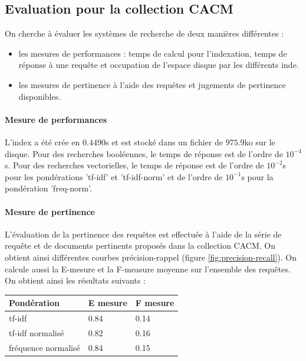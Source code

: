 \documentclass[12pt,a4paper]{article}
\begin{document}
\subsection{Evaluation pour la collection CACM}

On cherche à évaluer les systèmes de recherche de deux manières différentes :
\begin{itemize}
\item les mesures de performances : temps de calcul pour l’indexation, temps de réponse à une requête et occupation de l’espace disque par les différents inde.
\item les mesures de pertinence à l'aide des requêtes et jugements de pertinence disponibles.
\end{itemize}

\paragraph{Mesure de performances} L'index a été crée en $0.4490$s et est stocké dans un fichier de $975.9$ko sur le disque.
Pour des recherches booléennes, le temps de réponse est de l'ordre de $10^{-4}$s.
Pour des recherches vectorielles, le temps de réponse est de l'ordre de $10^{-2}$s pour les pondérations 'tf-idf' et 'tf-idf-norm' et de l'ordre de $10^{-1}$s pour la pondération 'freq-norm'.

\paragraph{Mesure de pertinence} L'évaluation de la pertinence des requêtes est effectuée à l'aide de la série de requête et de documents pertinents proposés dans la collection CACM. On obtient ainsi différentes courbes précision-rappel (figure \ref{fig:precision-recall}). On calcule aussi la E-mesure et la F-measure moyenne sur l'ensemble des requêtes. On obtient ainsi les résultats suivants :

\begin{table}[h]
\centering
\begin{tabular}{|l|l|l|}
\hline
Pondération         & E mesure & F mesure \\ \hline
tf-idf              & 0.84     & 0.14     \\ \hline
tf-idf normalisé    & 0.82     & 0.16     \\ \hline
fréquence normalisé & 0.84     & 0.15     \\ \hline
\end{tabular}
\end{table}
\end{document}
